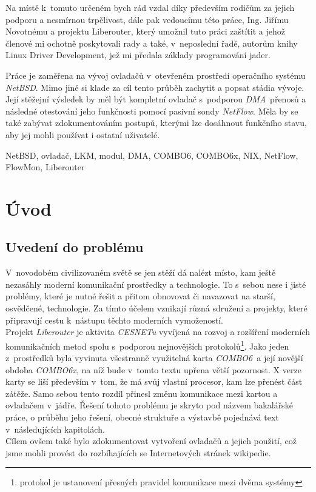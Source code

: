 \documentclass[final,11pt]{fithesis}
\newcommand{\com}{\emph{COMBO6}}
\newcommand{\comx}{\emph{COMBO6x}}
\newcommand{\nbsd}{\emph{NetBSD}}
\newcommand{\nflow}{\emph{NetFlow}}
\newcommand{\dma}{\emph{DMA}}
\begin{document}
\FrontMatter
\ThesisTitlePage
\begin{ThesisDeclaration}
  \DeclarationText
  \AdvisorName
\end{ThesisDeclaration}
\begin{ThesisThanks}
  Na místě k~tomuto určeném bych rád vzdal díky především rodičům za jejich
  podporu a nesmírnou trpělivost, dále pak vedoucímu této práce, Ing. Jiřímu
  Novotnému a projektu Liberouter, který umožnil tuto práci zaštítit a jehož
  členové mi ochotně poskytovali rady a také, v~neposlední řadě, autorům
  knihy Linux Driver Development\cite{ldd3}, jež mi předala základy
  programování jader.
\end{ThesisThanks}
\begin{ThesisAbstract}
  Práce je zaměřena na vývoj ovladačů v~otevřeném prostředí operačního systému
  \nbsd. Mimo jiné si klade za cíl tento průběh zachytit a popsat stádia
  vývoje. Její stěžejní výsledek by měl být kompletní ovladač s~podporou
  \dma\ přenosů a následné otestování jeho funkčnosti pomocí pasivní sondy
  \nflow. Měla by se také zabývat zdokumentováním postupů, kterými lze
  dosáhnout funkčního stavu, aby jej mohli používat i ostatní uživatelé.
\end{ThesisAbstract}
\begin{ThesisKeyWords}
  NetBSD, ovladač, LKM, modul, DMA, COMBO6, COMBO6x, NIX, NetFlow, FlowMon,
  Liberouter
\end{ThesisKeyWords}

\MainMatter
\tableofcontents
\chapter{Úvod}
  \section{Uvedení do problému}
  V~novodobém civilizovaném světě se jen stěží dá nalézt místo, kam ještě
  nezasáhly moderní komunikační prostředky a technologie. To s~sebou nese i
  jisté problémy, které je nutné řešit a přitom obnovovat či navazovat na
  starší, osvědčené, technologie. Za tímto účelem vznikají různá sdružení a
  projekty, které připravují cestu k~nástupu těchto moderních
  vymožeností. \\ \indent
  Projekt \emph{Liberouter}\cite{lbr} je aktivita \emph{CESNETu} vyvíjená
  na rozvoj a rozšíření
  moderních komunikačních metod spolu s~podporou nejnovějších
  protokolů\footnote{protokol je ustanovení přesných pravidel komunikace mezi
  dvěma systémy}. Jako jeden z~prostředků byla vyvinuta všestranně využitelná
  karta \com\ a její novější obdoba \comx, na níž bude
  v~tomto textu upře\-na větší pozornost.
  X verze karty se liší především v~tom, že má svůj vlastní procesor,
  kam lze přenést část zátěže. Samo sebou tento rozdíl přinesl změ\-nu
  komunikace mezi kartou a ovladačem v~jádře. Řešení tohoto problému je skryto
  pod názvem bakalářské práce, o průběhu jeho řešení, obecné struktuře a
  výstavbě pojednává text v~následujících kapitolách. \\ \indent
  Cílem ovšem také bylo zdokumentovat vytvoření
  ovladačů a jejich použití, což jsme mohli provést do rozbíhajících
  se Internetových stránek wikipedie.
\end{document}
